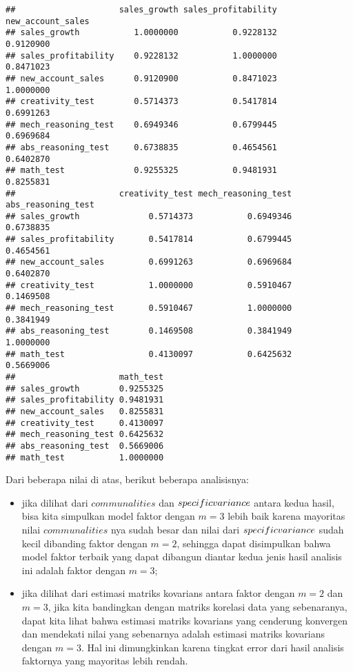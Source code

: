 \documentclass[
]{article}
\begin{document}
\begin{verbatim}
##                     sales_growth sales_profitability new_account_sales
## sales_growth           1.0000000           0.9228132         0.9120900
## sales_profitability    0.9228132           1.0000000         0.8471023
## new_account_sales      0.9120900           0.8471023         1.0000000
## creativity_test        0.5714373           0.5417814         0.6991263
## mech_reasoning_test    0.6949346           0.6799445         0.6969684
## abs_reasoning_test     0.6738835           0.4654561         0.6402870
## math_test              0.9255325           0.9481931         0.8255831
##                     creativity_test mech_reasoning_test abs_reasoning_test
## sales_growth              0.5714373           0.6949346          0.6738835
## sales_profitability       0.5417814           0.6799445          0.4654561
## new_account_sales         0.6991263           0.6969684          0.6402870
## creativity_test           1.0000000           0.5910467          0.1469508
## mech_reasoning_test       0.5910467           1.0000000          0.3841949
## abs_reasoning_test        0.1469508           0.3841949          1.0000000
## math_test                 0.4130097           0.6425632          0.5669006
##                     math_test
## sales_growth        0.9255325
## sales_profitability 0.9481931
## new_account_sales   0.8255831
## creativity_test     0.4130097
## mech_reasoning_test 0.6425632
## abs_reasoning_test  0.5669006
## math_test           1.0000000
\end{verbatim}

Dari beberapa nilai di atas, berikut beberapa analisisnya:

\begin{itemize}
\item
  jika dilihat dari \(communalities\) dan \(specific \space variance\)
  antara kedua hasil, bisa kita simpulkan model faktor dengan \(m = 3\)
  lebih baik karena mayoritas nilai \(communalities\) nya sudah besar
  dan nilai dari \(specific \space variance\) sudah kecil dibanding
  faktor dengan \(m = 2\), sehingga dapat disimpulkan bahwa model faktor
  terbaik yang dapat dibangun diantar kedua jenis hasil analisis ini
  adalah faktor dengan \(m = 3\);
\item
  jika dilihat dari estimasi matriks kovarians antara faktor dengan
  \(m = 2\) dan \(m = 3\), jika kita bandingkan dengan matriks korelasi
  data yang sebenaranya, dapat kita lihat bahwa estimasi matriks
  kovarians yang cenderung konvergen dan mendekati nilai yang sebenarnya
  adalah estimasi matriks kovarians dengan \(m = 3\). Hal ini
  dimungkinkan karena tingkat error dari hasil analisis faktornya yang
  mayoritas lebih rendah.
\end{itemize}
\end{document}
